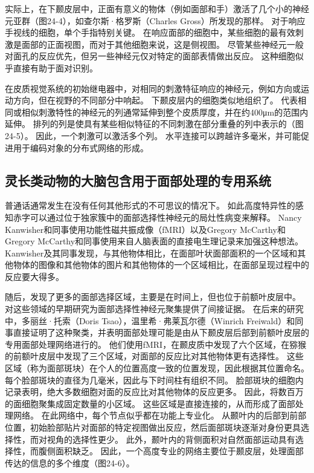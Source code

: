 实际上，在下颞皮层中，正面有意义的物体（例如面部和手）激活了几个小的神经元亚群（图24-4），如查尔斯·格罗斯（Charles Gross）所发现的那样。 对于响应手视线的细胞，单个手指特别关键。 在响应面部的细胞中，某些细胞的最有效刺激是面部的正面视图，而对于其他细胞来说，这是侧视图。 尽管某些神经元一般对面孔的反应优先，但另一些神经元仅对特定的面部表情做出反应。 这种细胞似乎直接有助于面对识别。

在皮质视觉系统的初始继电器中，对相同的刺激特征响应的神经元，例如方向或运动方向，但在视野的不同部分中响起。 下颞皮层内的细胞类似地组织了。 代表相同或相似刺激特性的神经元的列通常延伸到整个皮质厚度，并在约400μm的范围内延伸。 排列的列是使具有某些相似特征的不同刺激在部分重叠的列中表示的（图24-5）。 因此，一个刺激可以激活多个列。 水平连接可以跨越许多毫米，并可能促进用于编码对象的分布式网络的形成。

\subsection{灵长类动物的大脑包含用于面部处理的专用系统}
普通话通常发生在没有任何其他形式的不可思议的情况下。 如此高度特异性的感知赤字可以通过位于独家簇中的面部选择性神经元的局灶性病变来解释。 Nancy Kanwisher和同事使用功能性磁共振成像（fMRI）以及Gregory McCarthy和Gregory McCarthy和同事使用来自人脑表面的直接电生理记录来加强这种想法。 Kanwisher及其同事发现，与其他物体相比，在面部叶状面部面积的一个区域和其他物体的图像和其他物体的图片和其他物体的一个区域相比，在面部呈现过程中的反应要大得多。

随后，发现了更多的面部选择区域，主要是在时间上，但也位于前额叶皮层中。 对这些领域的早期研究为面部选择性神经元聚集提供了间接证据。 在后来的研究中，多丽丝·托索（Doris Tsao），温里希·弗莱瓦尔德（Winrich Freiwald）和同事直接证明了这种聚类，并表明面部处理可能是由从下颞皮层后部到前额叶皮层的专用面部处理网络进行的。 他们使用fMRI，在颞皮质中发现了六个区域，在猕猴的前额叶皮层中发现了三个区域，对面部的反应比对其他物体更有选择性。 这些区域（称为面部斑块）在个人的位置高度一致的位置发现，因此根据其位置命名。 每个脸部斑块的直径为几毫米，因此与下时间柱有组织不同。 脸部斑块的细胞内记录表明，绝大多数细胞对面的反应比对其他物体的反应更多。 因此，将数百万的面细胞聚集成固定数量的小区域。 这些区域是直接连接的，从而形成了面部处理网络。 在此网络中，每个节点似乎都在功能上专业化。 从颞叶内的后部到前部位置，初始脸部贴片对面部的特定视图做出反应，然后面部斑块逐渐对身份更具选择性，而对视角的选择性更少。 此外，颞叶内的背侧面积对自然面部运动具有选择性，而腹侧面积缺乏。 因此，一个高度专业的网络主要位于颞皮层，处理面部传达的信息的多个维度（图24-6）。

